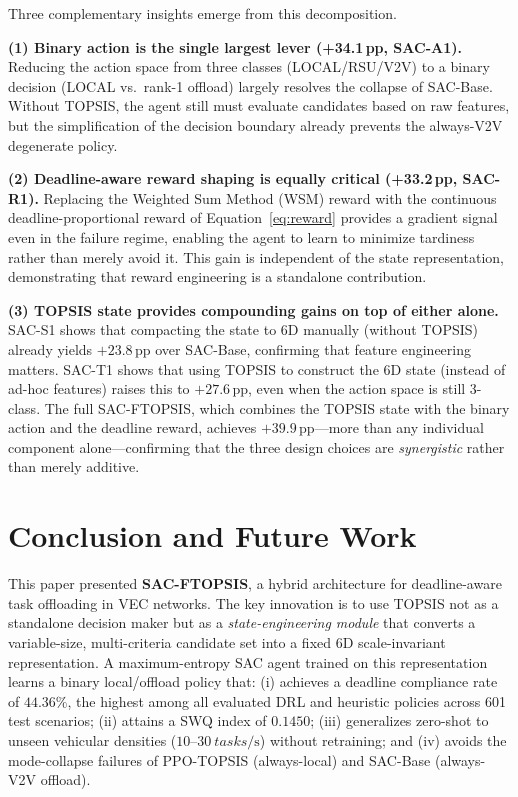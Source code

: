 \documentclass[iicol]{sn-jnl}
\begin{document}
Three complementary insights emerge from this decomposition.

\textbf{(1) Binary action is the single largest lever (+34.1\,pp, SAC-A1).}
Reducing the action space from three classes (LOCAL/RSU/V2V) to a binary
decision (LOCAL vs.\ rank-1 offload) largely resolves the collapse of
SAC-Base.
Without TOPSIS, the agent still must evaluate candidates based on raw features,
but the simplification of the decision boundary already prevents the
always-V2V degenerate policy.

\textbf{(2) Deadline-aware reward shaping is equally critical (+33.2\,pp, SAC-R1).}
Replacing the Weighted Sum Method (WSM) reward with the continuous
deadline-proportional reward of Equation~\eqref{eq:reward} provides a gradient
signal even in the failure regime, enabling the agent to learn to minimize
tardiness rather than merely avoid it.
This gain is independent of the state representation, demonstrating that
reward engineering is a standalone contribution.

\textbf{(3) TOPSIS state provides compounding gains on top of either alone.}
SAC-S1 shows that compacting the state to 6D manually (without TOPSIS)
already yields $+23.8$\,pp over SAC-Base, confirming that feature engineering
matters.
SAC-T1 shows that using TOPSIS to construct the 6D state (instead of ad-hoc
features) raises this to $+27.6$\,pp, even when the action space is still
3-class.
The full SAC-FTOPSIS, which combines the TOPSIS state with the binary action
and the deadline reward, achieves $+39.9$\,pp—more than any individual
component alone—confirming that the three design choices are
\emph{synergistic} rather than merely additive.

\section{Conclusion and Future Work}
\label{sec:conclusion}

This paper presented \textbf{SAC-FTOPSIS}, a hybrid architecture for
deadline-aware task offloading in VEC networks.
The key innovation is to use TOPSIS not as a standalone decision maker but as a
\emph{state-engineering module} that converts a variable-size, multi-criteria
candidate set into a fixed 6D scale-invariant representation.
A maximum-entropy SAC agent trained on this representation learns a binary
local/offload policy that:
(i) achieves a deadline compliance rate of $44.36\%$, the highest among
all evaluated DRL and heuristic policies across 601 test scenarios;
(ii) attains a SWQ index of $0.1450$;
(iii) generalizes zero-shot to unseen vehicular densities
($10$–$\SI{30}{tasks\per\second}$) without retraining;
and
(iv) avoids the mode-collapse failures of PPO-TOPSIS (always-local) and
SAC-Base (always-V2V offload).
\end{document}

